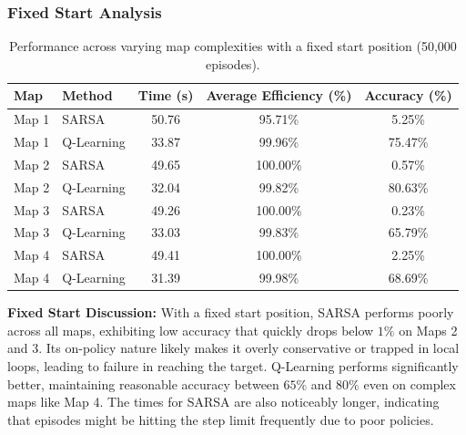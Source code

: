\documentclass{article}
\begin{document}
\subsubsection{Fixed Start Analysis}
\begin{table}[H]
\centering
\begin{tabular}{llccc}
\toprule
\textbf{Map} & \textbf{Method} & \textbf{Time (s)} & \textbf{Average Efficiency (\%)} & \textbf{Accuracy (\%)} \\ \midrule
Map 1 & SARSA       & 50.76 & 95.71\% & 5.25\% \\
Map 1 & Q-Learning  & 33.87 & 99.96\% & 75.47\% \\
Map 2 & SARSA       & 49.65 & 100.00\% & 0.57\% \\
Map 2 & Q-Learning  & 32.04 & 99.82\% & 80.63\% \\
Map 3 & SARSA       & 49.26 & 100.00\% & 0.23\% \\
Map 3 & Q-Learning  & 33.03 & 99.83\% & 65.79\% \\
Map 4 & SARSA       & 49.41 & 100.00\% & 2.25\% \\
Map 4 & Q-Learning  & 31.39 & 99.98\% & 68.69\% \\ \bottomrule
\end{tabular}
\caption{Performance across varying map complexities with a fixed start position (50,000 episodes).}
\end{table}

\textbf{Fixed Start Discussion:} With a fixed start position, SARSA performs poorly across all maps, exhibiting low accuracy that quickly drops below $1\%$ on Maps 2 and 3. Its on-policy nature likely makes it overly conservative or trapped in local loops, leading to failure in reaching the target. Q-Learning performs significantly better, maintaining reasonable accuracy between $65\%$ and $80\%$ even on complex maps like Map 4. The times for SARSA are also noticeably longer, indicating that episodes might be hitting the step limit frequently due to poor policies.
\end{document}
